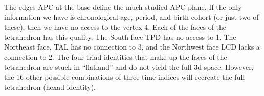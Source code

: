 \documentclass[12pt,oneside,a4paper]{article} %
\theoremstyle{definition}
\newcommand\vt[1]{\textcolor{rd}{#1}}
\begin{document}
The edges APC at the base define the much-studied APC plane. If the only
information we have is chronological age, period, and birth cohort (or just two
of these), then we have no access to the vertex 4. Each of the faces of the
tetrahedron has this quality. The South face TPD has no access to 1.
The Northeast face, TAL has no connection to 3, and the Northwest face
LCD lacks a connection to 2. The four triad identities that make up the faces of
the tetrahedron are stuck in ``flatland'' and do not yield the full 3d
space. However, the 16 other possible combinations of three time indices will
recreate the full tetrahedron (hexad identity).




\end{document}
